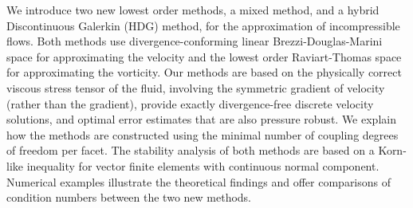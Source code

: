 We introduce two new lowest order methods, a mixed method, and a
hybrid Discontinuous Galerkin (HDG) method, for the approximation of
incompressible flows. Both methods use divergence-conforming linear
Brezzi-Douglas-Marini space for approximating the  velocity and the
lowest order Raviart-Thomas space for approximating  
the vorticity. Our methods are based on the physically correct viscous
stress tensor of the fluid, involving the symmetric gradient of
velocity (rather than the gradient),  provide exactly divergence-free
discrete velocity solutions, and optimal error estimates that are also
pressure robust. We explain how the methods are constructed using the
minimal number of coupling degrees of freedom per facet. The stability
analysis of both methods are based on a Korn-like inequality for
vector finite elements with continuous normal component. Numerical
examples illustrate  the theoretical findings and offer comparisons of
condition numbers between the two new methods.